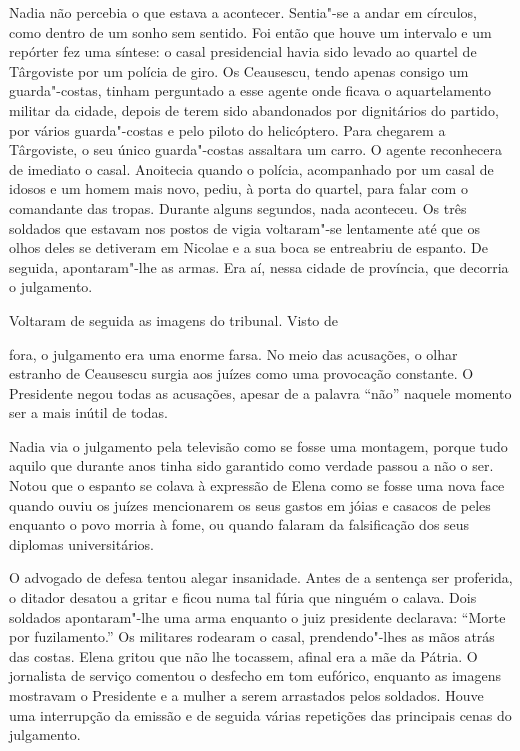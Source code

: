 Nadia não percebia o que estava a acontecer. Sentia"-se
a andar em círculos, como dentro de um sonho sem sentido. Foi então que houve um intervalo e um repórter fez uma síntese: o
casal presidencial havia sido levado ao quartel de Târgoviste por um
polícia de giro. Os Ceausescu, tendo apenas consigo um guarda"-costas,
tinham perguntado a esse agente onde ficava o aquartelamento militar da
cidade, depois de terem sido abandonados por dignitários do partido, por
vários guarda"-costas e pelo piloto do helicóptero. Para chegarem a
Târgoviste, o seu único guarda"-costas assaltara um carro. O agente
reconhecera de imediato o casal. Anoitecia quando o polícia,
acompanhado por um casal de idosos e um homem mais novo, pediu, à porta
do quartel, para falar com o comandante das tropas. Durante alguns
segundos, nada aconteceu. Os três soldados que estavam nos postos de
vigia voltaram"-se lentamente até que os olhos deles se detiveram em
Nicolae e a sua boca se entreabriu de espanto. De seguida, apontaram"-lhe
as armas. Era aí, nessa cidade de província, que decorria o julgamento.

Voltaram de seguida as imagens do tribunal. Visto de

fora, o julgamento era uma enorme farsa. No meio das acusações, o olhar
estranho de Ceausescu surgia aos juízes como uma provocação constante. O
Presidente negou todas as acusações, apesar de a palavra ``não'' naquele
momento ser a mais inútil de todas.

Nadia via o julgamento pela televisão como se fosse uma montagem, porque
tudo aquilo que durante anos tinha sido garantido como verdade passou a
não o ser. Notou que o espanto se colava à expressão de Elena como se
fosse uma nova face quando ouviu os juízes mencionarem os seus gastos
em jóias e casacos de peles enquanto o
povo morria à fome, ou quando falaram da falsificação dos seus diplomas
universitários.

O advogado de defesa tentou alegar insanidade. Antes de a sentença ser
proferida, o ditador desatou a gritar e ficou numa tal fúria que ninguém
o calava. Dois soldados apontaram"-lhe uma arma enquanto o juiz
presidente declarava: ``Morte por fuzilamento.'' Os militares rodearam o
casal, prendendo"-lhes as mãos atrás das costas. Elena gritou que não lhe
tocassem, afinal era a mãe da Pátria. O jornalista de serviço comentou o
desfecho em tom eufórico, enquanto as imagens mostravam o Presidente e
a mulher a serem arrastados pelos soldados. Houve uma interrupção da
emissão e de seguida várias repetições das principais cenas do
julgamento.

